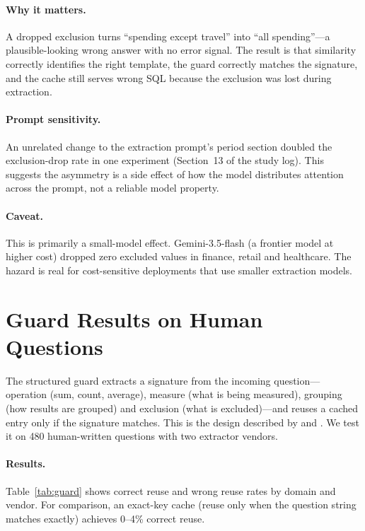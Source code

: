 \documentclass[11pt,a4paper]{article}
\begin{document}
\paragraph{Why it matters.} A dropped exclusion turns ``spending except
travel'' into ``all spending''---a plausible-looking wrong answer with no
error signal. The result is that similarity correctly identifies the right
template, the guard correctly matches the signature, and the cache still
serves wrong SQL because the exclusion was lost during extraction.

\paragraph{Prompt sensitivity.} An unrelated change to the extraction
prompt's period section doubled the exclusion-drop rate in one experiment
(Section~13 of the study log). This suggests the asymmetry is a side effect of how the model
distributes attention across the prompt, not a reliable model property.

\paragraph{Caveat.} This is primarily a small-model effect.
Gemini-3.5-flash (a frontier model at higher cost) dropped zero excluded
values in finance, retail and healthcare. The hazard is real for
cost-sensitive deployments that use smaller extraction models.

\section{Guard Results on Human Questions}
\label{sec:guard}

The structured guard extracts a signature from the incoming question---
operation (sum, count, average), measure (what is being measured),
grouping (how results are grouped) and exclusion (what is excluded)---and
reuses a cached entry only if the signature matches. This is the design
described by \citet{rathore2026cogni} and
\citet{bindschaedler2026semantic}. We test it on 480 human-written
questions with two extractor vendors.

\paragraph{Results.} Table~\ref{tab:guard} shows correct reuse and wrong
reuse rates by domain and vendor. For comparison, an exact-key cache
(reuse only when the question string matches exactly) achieves 0--4\%
correct reuse.
\end{document}
